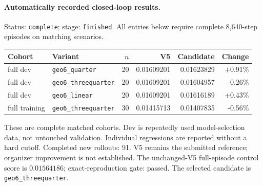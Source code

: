\paragraph{Automatically recorded closed-loop results.}
Status: \texttt{complete}; stage: \texttt{finished}.
All entries below require complete 8,640-step episodes on matching scenarios.
\begin{center}\small
\begin{tabular}{llrrrr}\toprule
Cohort & Variant & $n$ & V5 & Candidate & Change \\\midrule
full dev & \texttt{geo6\_quarter} & 20 & 0.01609201 & 0.01623829 & +0.91\% \\
full dev & \texttt{geo6\_threequarter} & 20 & 0.01609201 & 0.01604957 & -0.26\% \\
full dev & \texttt{geo6\_linear} & 20 & 0.01609201 & 0.01616189 & +0.43\% \\
full training & \texttt{geo6\_threequarter} & 30 & 0.01415713 & 0.01407835 & -0.56\% \\
\bottomrule\end{tabular}\end{center}
These are complete matched cohorts. Dev is repeatedly used model-selection data, not untouched validation. Individual regressions are reported without a hard cutoff.
Completed new rollouts: 91. V5 remains the submitted reference; organizer improvement is not established.
The unchanged-V5 full-episode control score is $0.01564186$; exact-reproduction gate: passed.
The selected candidate is \texttt{geo6\_threequarter}.

